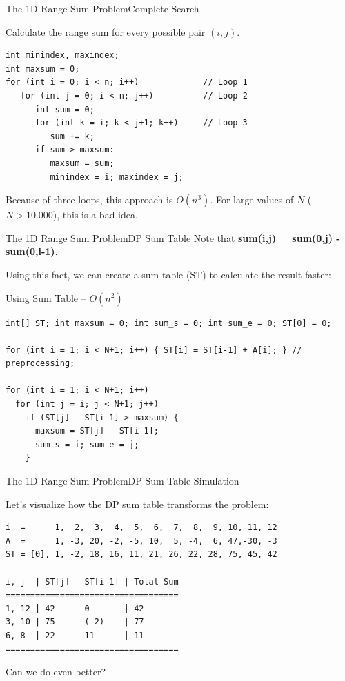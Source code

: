 \begin{frame}[fragile]{The 1D Range Sum Problem}{Complete Search}
  \begin{block}{    Calculate the range sum for every possible pair $(i,j)$.}

{\smaller
\begin{verbatim}
int minindex, maxindex;
int maxsum = 0;
for (int i = 0; i < n; i++)             // Loop 1
   for (int j = 0; i < n; j++)          // Loop 2
      int sum = 0;
      for (int k = i; k < j+1; k++)     // Loop 3
         sum += k;
      if sum > maxsum:
         maxsum = sum;
         minindex = i; maxindex = j;
\end{verbatim}
}
  \end{block}

  Because of three loops, this approach is $O(n^3)$. For large values of $N$ ($N > 10.000$), this is a bad idea.
\end{frame}

\begin{frame}[fragile]{The 1D Range Sum Problem}{DP Sum Table}
  Note that {\bf sum(i,j) = sum(0,j) - sum(0,i-1)}.\medskip

  Using this fact, we can create a sum table (ST) to calculate the result faster:

  \begin{block}{Using Sum Table -- $O(n^2)$}
{\smaller
\begin{verbatim}
int[] ST; int maxsum = 0; int sum_s = 0; int sum_e = 0; ST[0] = 0;

for (int i = 1; i < N+1; i++) { ST[i] = ST[i-1] + A[i]; } // preprocessing;

for (int i = 1; i < N+1; i++)
  for (int j = i; j < N+1; j++)
    if (ST[j] - ST[i-1] > maxsum) {
      maxsum = ST[j] - ST[i-1];
      sum_s = i; sum_e = j;
    }
\end{verbatim}
}
  \end{block}
\end{frame}

\begin{frame}[fragile]{The 1D Range Sum Problem}{DP Sum Table Simulation}

  Let's visualize how the DP sum table transforms the problem:

{\smaller
\begin{verbatim}
i  =      1,  2,  3,  4,  5,  6,  7,  8,  9, 10, 11, 12
A  =      1, -3, 20, -2, -5, 10,  5, -4,  6, 47,-30, -3
ST = [0], 1, -2, 18, 16, 11, 21, 26, 22, 28, 75, 45, 42

i, j  | ST[j] - ST[i-1] | Total Sum
===================================
1, 12 | 42    - 0       | 42
3, 10 | 75    - (-2)    | 77
6, 8  | 22    - 11      | 11
===================================
\end{verbatim}
}
\bigskip

Can we do even better?
\end{frame}

